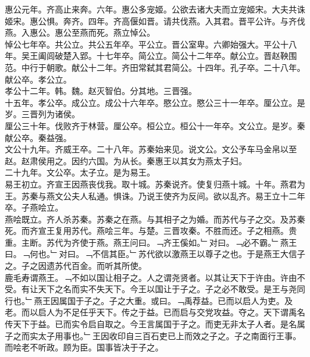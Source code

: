 \documentclass{zhvt-classic}
\begin{document}
\hspace*{2em}惠公元年。齐高止来奔。六年。惠公多宠姬。公欲去诸大夫而立宠姬宋。大夫共诛姬宋。惠公惧。奔齐。四年。齐高偃如晋。请共伐燕。入其君。晋平公许。与齐伐燕。入惠公。惠公至燕而死。燕立悼公。\\
\hspace*{2em}悼公七年卒。共公立。共公五年卒。平公立。晋公室卑。六卿始强大。平公十八年。吴王阖闾破楚入郢。十七年卒。简公立。简公十二年卒。献公立。晋赵鞅围范。中行于朝歌。献公十二年。齐田常弑其君简公。十四年。孔子卒。二十八年。献公卒。孝公立。\\
\hspace*{2em}孝公十二年。韩。魏。赵灭智伯。分其地。三晋强。\\
\hspace*{2em}十五年。孝公卒。成公立。成公十六年卒。愍公立。愍公三十一年卒。厘公立。是岁。三晋列为诸侯。\\
\hspace*{2em}厘公三十年。伐败齐于林营。厘公卒。桓公立。桓公十一年卒。文公立。是岁。秦献公卒。秦益强。\\
\hspace*{2em}文公十九年。齐威王卒。二十八年。苏秦始来见。说文公。文公予车马金帛以至赵。赵肃侯用之。因约六国。为从长。秦惠王以其女为燕太子妇。\\
\hspace*{2em}二十九年。文公卒。太子立。是为易王。\\
\hspace*{2em}易王初立。齐宣王因燕丧伐我。取十城。苏秦说齐。使复归燕十城。十年。燕君为王。苏秦与燕文公夫人私通。惧诛。乃说王使齐为反间。欲以乱齐。易王立十二年卒。子燕哙立。\\
\hspace*{2em}燕哙既立。齐人杀苏秦。苏秦之在燕。与其相子之为婚。而苏代与子之交。及苏秦死。而齐宣王复用苏代。燕哙三年。与楚。三晋攻秦。不胜而还。子之相燕。贵重。主断。苏代为齐使于燕。燕王问曰。﹁齐王傒如。﹂对曰。﹁必不霸。﹂燕王曰。﹁何也。﹂对曰。﹁不信其臣。﹂苏代欲以激燕王以尊子之也。于是燕王大信子之。子之因遗苏代百金。而听其所使。\\
\hspace*{2em}鹿毛寿谓燕王。﹁不如以国让相子之。人之谓尧贤者。以其让天下于许由。许由不受。有让天下之名而实不失天下。今王以国让于子之。子之必不敢受。是王与尧同行也。﹂燕王因属国于子之。子之大重。或曰。﹁禹荐益。已而以启人为吏。及老。而以启人为不足任乎天下。传之于益。已而启与交党攻益。夺之。天下谓禹名传天下于益。已而实令启自取之。今王言属国于子之。而吏无非太子人者。是名属子之而实太子用事也。﹂王因收印自三百石吏已上而效之子之。子之南面行王事。而哙老不听政。顾为臣。国事皆决于子之。\\
\end{document}
